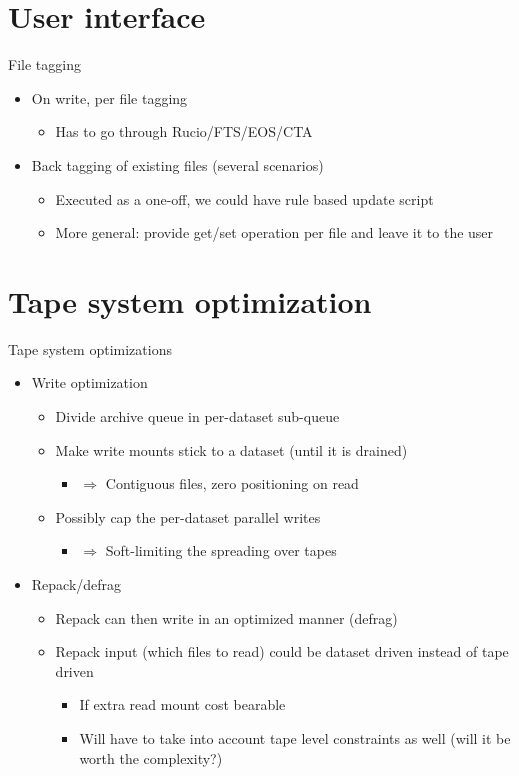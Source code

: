 \documentclass[aspectratio=149]{beamer}
\begin{document}
\section{User interface}
\begin{frame}{File tagging}
\begin{itemize}
  \item On write, per file tagging
  \begin{itemize}
    \item Has to go through Rucio/FTS/EOS/CTA
  \end{itemize}
  \item Back tagging of existing files (several scenarios)
  \begin{itemize}
    \item Executed as a one-off, we could have rule based update script
    \item More general: provide get/set operation per file and leave it to the user
  \end{itemize}
\end{itemize}
\end{frame}

\section{Tape system optimization}
\begin{frame}{Tape system optimizations}
\begin{itemize}
  \item Write optimization
  \begin{itemize}
    \item Divide archive queue in per-dataset sub-queue
    \item Make write mounts stick to a dataset (until it is drained)
    \begin{itemize}
      \item $\Rightarrow$ Contiguous files, zero positioning on read
    \end{itemize}
    \item Possibly cap the per-dataset parallel writes
    \begin{itemize}
      \item $\Rightarrow$ Soft-limiting the spreading over tapes
    \end{itemize}
  \end{itemize}
  \item Repack/defrag
  \begin{itemize}
    \item Repack can then write in an optimized manner (defrag)
    \item Repack input (which files to read) could be dataset driven instead of tape driven
    \begin{itemize}
      \item If extra read mount cost bearable
      \item Will have to take into account tape level constraints as well (will it be worth the complexity?)
    \end{itemize}
  \end{itemize}
\end{itemize}
\end{frame}
\end{document}

